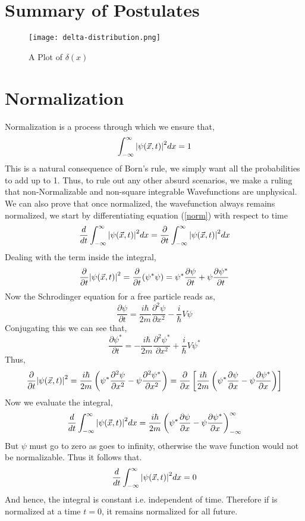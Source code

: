 \section{Summary of Postulates}
\begin{figure}
	\centering
	\texttt{[image: delta-distribution.png]}
	\caption{A Plot of $\delta(x)$}
\end{figure}
\section{Normalization}
Normalization is a process through which we ensure that,
\begin{equation}\label{norm}
	\int_{- \infty}^{\infty} \abs{\psi(\vec{x}, t)}^{2} dx = 1
\end{equation}
This is a natural consequence of Born's rule, we simply want all the probabilities to add up to 1. Thus, to rule out any other absurd scenarios, we make a ruling that non-Normalizable and non-square integrable Wavefunctions are unphysical.\\
We can also prove that once normalized, the wavefunction always remains normalized, we start by differentiating equation (\ref{norm}) with respect to time\\
$$\frac{d}{dt} \int_{- \infty}^{\infty} \abs{\psi(\vec{x}, t)}^{2} dx = \frac{\partial}{\partial t}\int_{- \infty}^{\infty} \abs{\psi(\vec{x}, t)}^{2} dx$$
Dealing with the term inside the integral,
$$ \frac{\partial}{\partial t}\abs{\psi(\vec{x}, t)}^{2} = \frac{\partial}{\partial t} (\psi^{*} \psi ) = \psi^{*}\frac{\partial \psi}{\partial t} + \psi\frac{\partial \psi^{*}}{\partial t}$$
Now the Schrodinger equation for a free particle reads as,
$$\frac{\partial \psi}{\partial t} = \frac{i \hbar}{2m}\frac{\partial^{2} \psi}{\partial x^{2}} - \frac{i}{\hbar}V \psi$$
Conjugating this we can see that,
$$\frac{\partial \psi^{*}}{\partial t} = -\frac{i \hbar}{2m}\frac{\partial^{2} \psi^{*}}{\partial x^{2}} + \frac{i}{\hbar}V \psi^{*}$$
Thus,
$$\frac{\partial}{\partial t}\abs{\psi(\vec{x}, t)}^{2} = \frac{i \hbar}{2m}\left( \psi^{*} \frac{\partial^{2} \psi}{\partial x^{2}} - \psi \frac{\partial^{2} \psi^{*}}{\partial x^{2}} \right) = \frac{\partial }{\partial x}\left[\frac{i \hbar}{2m}\left( \psi^{*} \frac{\partial \psi}{\partial x} - \psi \frac{\partial \psi^{*}}{\partial x} \right)\right]$$
Now we evaluate the integral,
$$\frac{d}{dt} \int_{- \infty}^{\infty} \abs{\psi(\vec{x}, t)}^{2} dx = \frac{i \hbar}{2m}\left( \psi^{*} \frac{\partial \psi}{\partial x} - \psi \frac{\partial \psi^{*}}{\partial x} \right)^{\infty}_{- \infty} $$
But $\psi$ must go to zero as goes to infinity, otherwise the wave function would not be normalizable. Thus it follows that.
\begin{equation}
	\frac{d}{dt} \int_{- \infty}^{\infty} \abs{\psi(\vec{x}, t)}^{2} dx = 0
\end{equation}
And hence, the integral is constant i.e. independent of time. Therefore if is normalized at a time $t = 0$, it remains normalized for all future. 
